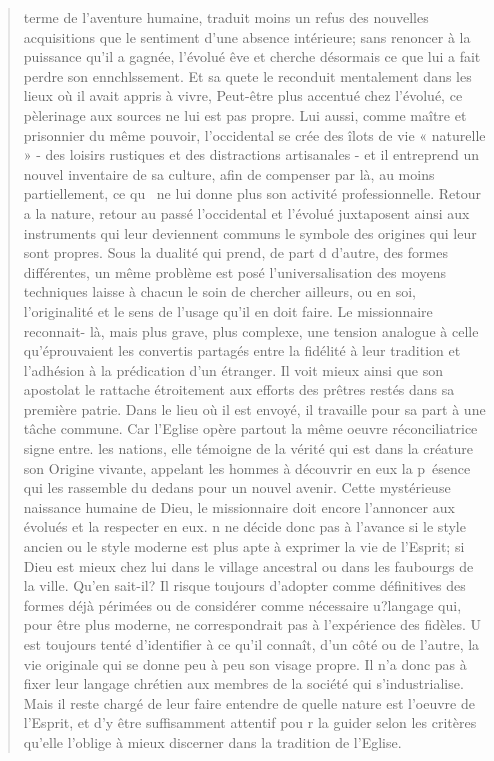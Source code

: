 \begin{quote}
terme de l'aventure humaine, traduit moins un refus
des nouvelles acquisitions que le sentiment d'une absence
intérieure; sans renoncer à la puissance qu'il a gagnée,
l'évolué  êve et cherche désormais ce que lui a fait perdre
son ennchlssement. Et sa quete le reconduit mentalement
dans les lieux où il avait appris à vivre,
Peut-être plus accentué chez l'évolué, ce pèlerinage aux
sources ne lui est pas propre. Lui aussi, comme maître et
prisonnier du même pouvoir, l'occidental se crée des îlots
de vie « naturelle » - des loisirs rustiques et des distractions
artisanales - et il entreprend un nouvel inventaire
de sa culture, afin de compenser par là, au moins partiellement,
ce qu~ ne lui donne plus son activité professionnelle.
Retour a la nature, retour au passé   l'occidental et
l'évolué juxtaposent ainsi aux instruments qui leur
deviennent communs le symbole des origines qui leur sont
propres. Sous la dualité qui prend, de part d d'autre, des
formes différentes, un même problème est posé   l'universalisation des moyens techniques laisse à chacun le soin
de chercher ailleurs, ou en soi, l'originalité et le sens
de l'usage qu'il en doit faire.
Le missionnaire reconnait- là, mais plus grave, plus
complexe, une tension analogue à celle qu'éprouvaient
les convertis partagés entre la  fidélité à leur tradition
et l'adhésion à la prédication d'un étranger. Il
voit mieux ainsi que son apostolat le rattache étroitement
aux efforts des prêtres restés dans sa première patrie.
Dans le lieu où il est envoyé, il travaille pour sa part à
une tâche commune. Car l'Eglise opère partout la même
oeuvre réconciliatrice   signe entre. les nations, elle
témoigne de la vérité qui est dans la créature son Origine
vivante, appelant les hommes à découvrir en eux la p~ésence
qui les rassemble du dedans pour un nouvel avenir.
Cette mystérieuse naissance humaine de Dieu, le missionnaire
doit encore l'annoncer aux évolués et la respecter
en eux. n ne décide donc pas à l'avance si le style ancien
ou le style moderne est plus apte à exprimer la vie de
l'Esprit; si Dieu est mieux chez lui dans le village ancestral
ou dans les faubourgs de la ville. Qu'en sait-il? Il
 risque toujours d'adopter comme définitives des formes
déjà périmées ou de considérer comme nécessaire u?langage
qui, pour être plus moderne, ne correspondrait
pas à l'expérience des fidèles. U est toujours tenté d'identifier
à ce qu'il connaît, d'un côté ou de l'autre, la vie
originale qui se donne peu à peu son visage propre. Il
n'a donc pas à fixer leur langage chrétien aux membres
de la société qui s'industrialise. Mais il reste chargé de
leur faire entendre de quelle nature est l'oeuvre de l'Esprit,
et d'y être suffisamment attentif pou r la guider
selon les critères qu'elle l'oblige à mieux discerner dans
la tradition de l'Eglise.
 \end{quote}
